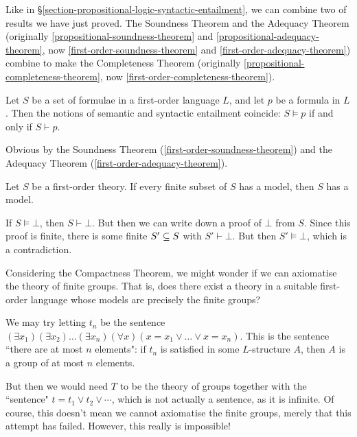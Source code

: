 \documentclass{article}
\begin{document}
Like in \S\ref{section-propositional-logic-syntactic-entailment}, we can combine two of results we have just proved. The Soundness Theorem and the Adequacy Theorem (originally \ref{propositional-soundness-theorem} and \ref{propositional-adequacy-theorem}, now \ref{first-order-soundness-theorem} and \ref{first-order-adequacy-theorem}) combine  to make the Completeness Theorem (originally \ref{propositional-completeness-theorem}, now \ref{first-order-completeness-theorem}).

\begin{theorem}
    \label{first-order-completeness-theorem}
    Let $S$ be a set of formulae in a first-order language $L$, and let $p$ be a formula in $L$. Then the notions of semantic and syntactic entailment coincide: $S \vDash p$ if and only if $S \vdash p$.
\end{theorem}

\begin{prf}
    Obvious by the Soundness Theorem (\ref{first-order-soundness-theorem}) and the Adequacy Theorem (\ref{first-order-adequacy-theorem}).
\end{prf}

\begin{theorem}
    Let $S$ be a first-order theory. If every finite subset of $S$ has a model, then $S$ has a model.
\end{theorem}

\begin{prf}
    If $S \vDash \bot$, then $S \vdash \bot$. But then we can write down a proof of $\bot$ from $S$. Since this proof is finite, there is some finite $S' \subseteq S$ with $S' \vdash \bot$. But then $S' \vDash \bot$, which is a contradiction.
\end{prf}

Considering the Compactness Theorem, we might wonder if we can axiomatise the theory of finite groups. That is, does there exist a theory in a suitable first-order language whose models are precisely the finite groups?

We may try letting $t_n$ be the sentence $(\exists x_1)(\exists x_2)\dots(\exists x_n)(\forall x)(x = x_1 \lor \dots \lor x = x_n)$. This is the sentence ``there are at most $n$ elements": if $t_n$ is satisfied in some $L$-structure $A$, then $A$ is a group of at most $n$ elements.

But then we would need $T$ to be the theory of groups together with the ``sentence" $t = t_1 \lor t_2 \lor \cdots$, which is not actually a sentence, as it is infinite. Of course, this doesn't mean we cannot axiomatise the finite groups, merely that this attempt has failed. However, this really is impossible!
\end{document}
